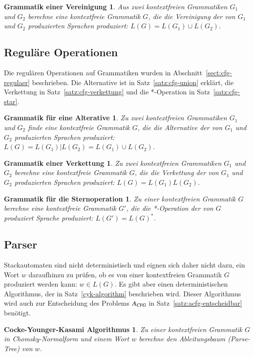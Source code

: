 \newtheorem*{CfgUnion}{Grammatik einer Vereinigung}
\begin{CfgUnion}
Aus zwei kontextfreien Grammatiken $G_1$ und $G_2$ berechne
eine kontextfreie Grammatik $G$, die die
Vereinigung der von $G_1$ und $G_2$ produzierten Sprachen produziert:
$L(G)=L(G_1)\cup L(G_2)$.
\end{CfgUnion}

\subsection{Reguläre Operationen}
Die regulären Operationen auf Grammatiken wurden in
Abschnitt~\ref{sect:cfg-regulaer} beschrieben.
Die Alternative ist in Satz~\ref{satz:cfg-union} erklärt,
die Verkettung in Satz~\ref{satz:cfg-verkettung} und die *-Operation
in Satz~\ref{satz:cfg-star}.

\newtheorem*{CfgAlternative}{Grammatik für eine Alterative}
\begin{CfgAlternative}
Zu zwei kontextfreien Grammatiken $G_1$ und $G_2$ finde eine
kontextfreie Grammatik $G$, die die
Alternative der von $G_1$ und $G_2$ produzierten Sprachen produziert:
$L(G)=L(G_1)|L(G_2)=L(G_1)\cup L(G_2)$.
\end{CfgAlternative}

\newtheorem*{CfgConcatenation}{Grammatik einer Verkettung}
\begin{CfgConcatenation}
Zu zwei kontextfreien Grammatiken $G_1$ und $G_2$ berechne eine 
kontextfreie Grammatik $G$, die die Verkettung der von $G_1$ und $G_2$
produzierten Sprachen produziert: $L(G)=L(G_1)L(G_2)$.
\end{CfgConcatenation}

\newtheorem*{CfgStar}{Grammatik für die Sternoperation}
\begin{CfgStar}
Zu einer kontextfreien Grammatik $G$ berechne eine kontextfreie Grammatik
$G'$, die die *-Operation der von $G$ produziert Sprache produziert:
$L(G')=L(G)^*$.
\end{CfgStar}

\subsection{Parser}
Stackautomaten sind nicht deterministisch und eignen sich daher nicht
dazu, ein Wort $w$ daraufhinzu zu prüfen, ob es von einer kontextfreien
Grammatik $G$ produziert werden kann: $w\in L(G)$.
Es gibt aber einen deterministischen Algorithmus, der in
Satz~\ref{cyk-algorithm} beschrieben wird.
Dieser Algorithmus wird auch zur Entscheidung des Problems $A_\textsl{CFG}$
in Satz~\ref{satz:acfg-entscheidbar}
benötigt.

\newtheorem*{CYK}{Cocke-Younger-Kasami Algorithmus}
\begin{CYK}
Zu einer kontextfreien Grammatik $G$ in Chomsky-Nor\-mal\-form und einem
Wort $w$ berechne den Ableitungsbaum (Parse-Tree) von $w$.
\end{CYK}




